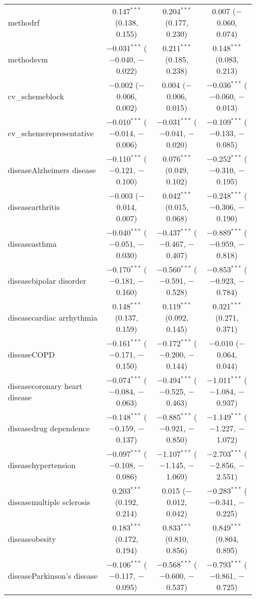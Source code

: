 \begin{table}[!htbp]
\begin{tabular}{@{\extracolsep{5pt}}lccc}
  methodrf & 0.147$^{***}$ (0.138, 0.155) & 0.204$^{***}$ (0.177, 0.230) & 0.007 ($-$0.060, 0.074) \\ 
  methodsvm & $-$0.031$^{***}$ ($-$0.040, $-$0.022) & 0.211$^{***}$ (0.185, 0.238) & 0.148$^{***}$ (0.083, 0.213) \\ 
  cv\_schemeblock & $-$0.002 ($-$0.006, 0.002) & 0.004 ($-$0.006, 0.015) & $-$0.036$^{***}$ ($-$0.060, $-$0.013) \\ 
  cv\_schemerepresentative & $-$0.010$^{***}$ ($-$0.014, $-$0.006) & $-$0.031$^{***}$ ($-$0.041, $-$0.020) & $-$0.109$^{***}$ ($-$0.133, $-$0.085) \\ 
  diseaseAlzheimers disease & $-$0.110$^{***}$ ($-$0.121, $-$0.100) & 0.076$^{***}$ (0.049, 0.102) & $-$0.252$^{***}$ ($-$0.310, $-$0.195) \\ 
  diseasearthritis & $-$0.003 ($-$0.014, 0.007) & 0.042$^{***}$ (0.015, 0.068) & $-$0.248$^{***}$ ($-$0.306, $-$0.190) \\ 
  diseaseasthma & $-$0.040$^{***}$ ($-$0.051, $-$0.030) & $-$0.437$^{***}$ ($-$0.467, $-$0.407) & $-$0.889$^{***}$ ($-$0.959, $-$0.818) \\ 
  diseasebipolar disorder & $-$0.170$^{***}$ ($-$0.181, $-$0.160) & $-$0.560$^{***}$ ($-$0.591, $-$0.528) & $-$0.853$^{***}$ ($-$0.923, $-$0.784) \\ 
  diseasecardiac arrhythmia & 0.148$^{***}$ (0.137, 0.159) & 0.119$^{***}$ (0.092, 0.145) & 0.321$^{***}$ (0.271, 0.371) \\ 
  diseaseCOPD & $-$0.161$^{***}$ ($-$0.171, $-$0.150) & $-$0.172$^{***}$ ($-$0.200, $-$0.144) & $-$0.010 ($-$0.064, 0.044) \\ 
  diseasecoronary heart disease & $-$0.074$^{***}$ ($-$0.084, $-$0.063) & $-$0.494$^{***}$ ($-$0.525, $-$0.463) & $-$1.011$^{***}$ ($-$1.084, $-$0.937) \\ 
  diseasedrug dependence & $-$0.148$^{***}$ ($-$0.159, $-$0.137) & $-$0.885$^{***}$ ($-$0.921, $-$0.850) & $-$1.149$^{***}$ ($-$1.227, $-$1.072) \\ 
  diseasehypertension & $-$0.097$^{***}$ ($-$0.108, $-$0.086) & $-$1.107$^{***}$ ($-$1.145, $-$1.069) & $-$2.703$^{***}$ ($-$2.856, $-$2.551) \\ 
  diseasemultiple sclerosis & 0.203$^{***}$ (0.192, 0.214) & 0.015 ($-$0.012, 0.042) & $-$0.283$^{***}$ ($-$0.341, $-$0.225) \\ 
  diseaseobesity & 0.183$^{***}$ (0.172, 0.194) & 0.833$^{***}$ (0.810, 0.856) & 0.849$^{***}$ (0.804, 0.895) \\ 
  diseaseParkinson's disease & $-$0.106$^{***}$ ($-$0.117, $-$0.095) & $-$0.568$^{***}$ ($-$0.600, $-$0.537) & $-$0.793$^{***}$ ($-$0.861, $-$0.725) \\ 

\end{tabular}
\end{table}
